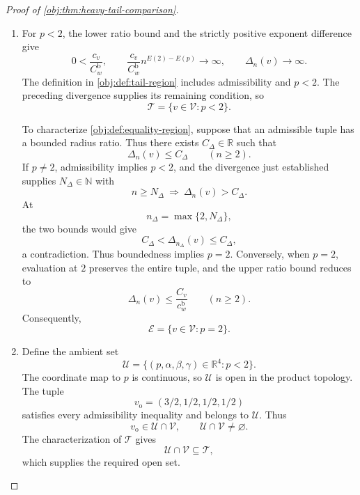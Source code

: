 \documentclass[11pt]{article}
\begin{document}
\begin{proof}[Proof of \cref{obj:thm:heavy-tail-comparison}]
\begin{enumerate}
\item For \(p<2\), the lower ratio bound and the strictly positive exponent difference give
\[
0<\frac{c_v}{C_w^{\mathrm b}},
\qquad
\frac{c_v}{C_w^{\mathrm b}}n^{E(2)-E(p)}
\longrightarrow\infty,
\qquad
\Delta_n(v)\longrightarrow\infty.
\]
The definition in \cref{obj:def:tail-region} includes admissibility and \(p<2\). The preceding divergence supplies its remaining condition, so
\[
\mathcal T=\{v\in\mathcal V:p<2\}.
\]

To characterize \cref{obj:def:equality-region}, suppose that an admissible tuple has a bounded radius ratio. Thus there exists \(C_\Delta\in\mathbb R\) such that
\[
\Delta_n(v)\le C_\Delta
\qquad(n\ge2).
\]
If \(p\ne2\), admissibility implies \(p<2\), and the divergence just established supplies \(N_\Delta\in\mathbb N\) with
\[
n\ge N_\Delta\ \Longrightarrow\ \Delta_n(v)>C_\Delta.
\]
At
\[
n_\Delta=\max\{2,N_\Delta\},
\]
the two bounds would give
\[
C_\Delta<\Delta_{n_\Delta}(v)\le C_\Delta,
\]
a contradiction. Thus boundedness implies \(p=2\). Conversely, when \(p=2\), evaluation at \(2\) preserves the entire tuple, and the upper ratio bound reduces to
\[
\Delta_n(v)\le\frac{C_v}{c_w^{\mathrm b}}
\qquad(n\ge2).
\]
Consequently,
\[
\mathcal E=\{v\in\mathcal V:p=2\}.
\]

\item Define the ambient set
\[
\mathcal U
=\{(p,\alpha,\beta,\gamma)\in\mathbb R^4:p<2\}.
\]
The coordinate map to \(p\) is continuous, so \(\mathcal U\) is open in the product topology. The tuple
\[
v_{\mathrm o}=(3/2,1/2,1/2,1/2)
\]
satisfies every admissibility inequality and belongs to \(\mathcal U\). Thus
\[
v_{\mathrm o}\in\mathcal U\cap\mathcal V,
\qquad
\mathcal U\cap\mathcal V\ne\varnothing.
\]
The characterization of \(\mathcal T\) gives
\[
\mathcal U\cap\mathcal V\subseteq\mathcal T,
\]
which supplies the required open set.


\end{enumerate}
\end{proof}
\end{document}
